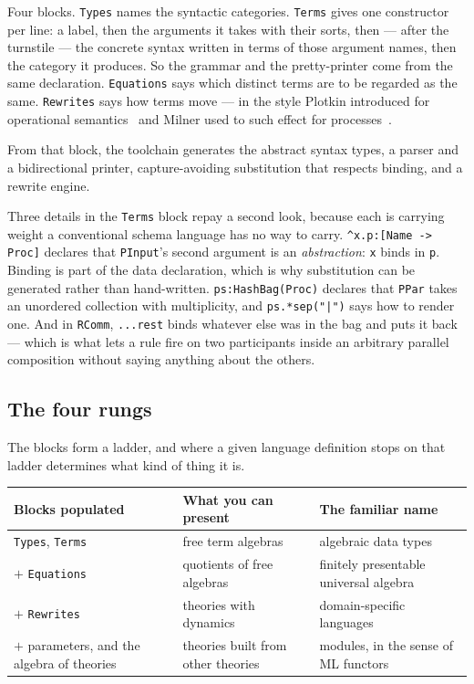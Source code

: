 Four blocks. \texttt{Types} names the syntactic categories. \texttt{Terms} gives
one constructor per line: a label, then the arguments it takes with their sorts,
then --- after the turnstile --- the concrete syntax written in terms of those
argument names, then the category it produces. So the grammar and the
pretty-printer come from the same declaration. \texttt{Equations} says which
distinct terms are to be regarded as the same. \texttt{Rewrites} says how terms
move --- in the style Plotkin introduced for operational
semantics~\cite{Plotkin81} and Milner used to such effect for
processes~\cite{Milner92}.

From that block, the toolchain generates the abstract syntax types, a parser and
a bidirectional printer, capture-avoiding substitution that respects binding,
and a rewrite engine.

Three details in the \texttt{Terms} block repay a second look, because each is
carrying weight a conventional schema language has no way to carry.
\texttt{\^{}x.p:[Name -> Proc]} declares that \texttt{PInput}'s second argument
is an \emph{abstraction}: \texttt{x} binds in \texttt{p}. Binding is part of the
data declaration, which is why substitution can be generated rather than
hand-written. \texttt{ps:HashBag(Proc)} declares that \texttt{PPar} takes an
unordered collection with multiplicity, and \texttt{ps.*sep("|")} says how to
render one. And in \texttt{RComm}, \texttt{...rest} binds whatever else was in
the bag and puts it back --- which is what lets a rule fire on two participants
inside an arbitrary parallel composition without saying anything about the
others.

\subsection{The four rungs}
\label{sec:rungs}

The blocks form a ladder, and where a given language definition stops on
that ladder determines what kind of thing it is.

\begin{center}
\small
\begin{tabular}{@{}L{0.26\textwidth}L{0.32\textwidth}L{0.32\textwidth}@{}}
\toprule
\textbf{Blocks populated} & \textbf{What you can present} & \textbf{The familiar name} \\
\midrule
\texttt{Types}, \texttt{Terms} &
free term algebras &
algebraic data types \\[3pt]
$+$ \texttt{Equations} &
quotients of free algebras &
finitely presentable universal algebra \\[3pt]
$+$ \texttt{Rewrites} &
theories with dynamics &
domain-specific languages \\[3pt]
$+$ parameters, and the algebra of theories &
theories built from other theories &
modules, in the sense of ML functors \\
\bottomrule
\end{tabular}
\end{center}

